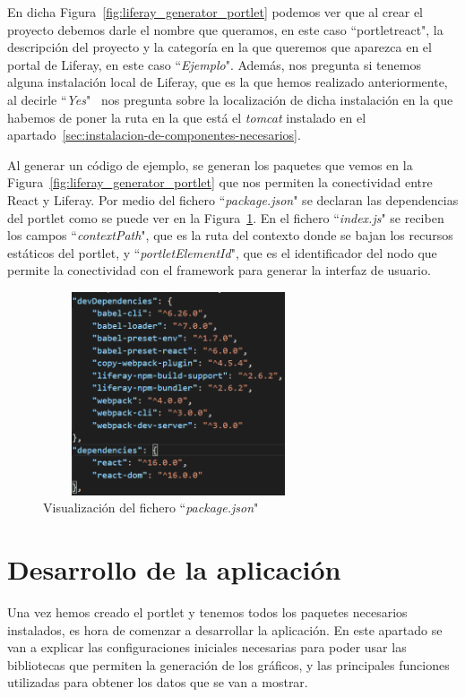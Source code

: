 \documentclass[a4paper, 12pt]{book}
\begin{document}
En dicha Figura~\ref{fig:liferay_generator_portlet} podemos ver que al crear el proyecto debemos darle el nombre que queramos, en este caso ``portletreact", la descripción del proyecto y la categoría en la que queremos que aparezca en el portal de Liferay, en este caso ``\textit{Ejemplo}". 
Además, nos pregunta si tenemos alguna instalación local de Liferay, que es la que hemos realizado anteriormente, al decirle ``\textit{Yes}" \ nos pregunta sobre la localización de dicha instalación en la que habemos de poner la ruta en la que está el \textit{tomcat} instalado en el apartado~\ref{sec:instalacion-de-componentes-necesarios}.

Al generar un código de ejemplo, se generan los paquetes que vemos en la Figura~\ref{fig:liferay_generator_portlet} que nos permiten la conectividad entre React y Liferay. Por medio del fichero ``\textit{package.json}" se declaran las dependencias del portlet como se puede ver en la Figura~\ref{fig:package_ini}. En el fichero ``\textit{index.js}" se reciben los campos ``\textit{contextPath}", que es la ruta del contexto donde se bajan los recursos estáticos del portlet, y ``\textit{portletElementId}", que es el identificador del nodo que permite la conectividad con el framework para generar la interfaz de usuario.
\begin{figure}[h]
  \centering
  \includegraphics[width=8cm, height=6cm]{img_usadas/package_ini.png}
  \caption{Visualización del fichero ``\textit{package.json}"}
  \label{fig:package_ini}
\end{figure}


\vspace{5mm}
\section{Desarrollo de la aplicación} 
\label{sec:desarrollo-aplicacion}
Una vez hemos creado el portlet y tenemos todos los paquetes necesarios instalados, es hora de comenzar a desarrollar la aplicación. En este apartado se van a explicar las configuraciones iniciales necesarias para poder usar las bibliotecas que permiten la generación de los gráficos, y las principales funciones utilizadas para obtener los datos que se van a mostrar.
\end{document}

